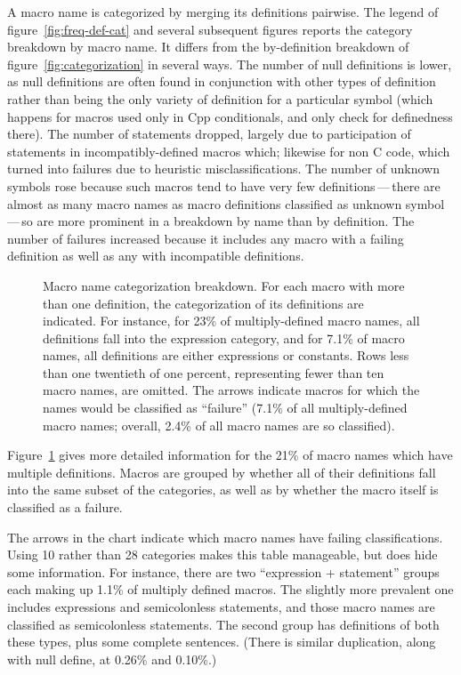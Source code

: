 \documentclass[10pt]{article}
\begin{document}
A macro name is categorized by merging its definitions pairwise.  The
legend of figure~\ref{fig:freq-def-cat} and several subsequent figures
reports the category breakdown by macro name.  It differs from the
by-definition breakdown of figure~\ref{fig:categorization} in several ways.
The number of null definitions is lower, as null definitions are often
found in conjunction with other types of definition rather than being the
only variety of definition for a particular symbol (which happens for
macros used only in Cpp conditionals, and only check for definedness
there).  The number of statements dropped, largely due to participation of
statements in incompatibly-defined macros which; likewise for non C code,
which turned into failures due to heuristic misclassifications.  The number
of unknown symbols rose because such macros tend to have very few
definitions\,---\,there are almost as many macro names as macro definitions
classified as unknown symbol\,---\,so are more prominent in a breakdown by
name than by definition.  The number of failures increased because it
includes any macro with a failing definition as well as any with
incompatible definitions.


\begin{figure}
  {\small\centerline{}}
  
  \caption{Macro name categorization breakdown.  For each macro with more
    than one definition, the categorization of its definitions are
    indicated.  For instance, for 23\% of multiply-defined macro names, all
    definitions fall into the expression category, and for 7.1\% of macro
    names, all definitions are either expressions or constants.  Rows less
    than one twentieth of one percent, representing fewer than ten macro
    names, are omitted.  The arrows indicate macros for which the names
    would be classified as ``failure'' (7.1\% of all multiply-defined macro
    names; overall, 2.4\% of all macro names are so classified).}

  \label{fig:subset-categories}
\end{figure}

Figure~\ref{fig:subset-categories} gives more detailed information for the
21\% of macro names which have multiple definitions.  Macros are grouped by
whether all of their definitions fall into the same subset of the
categories, as well as by whether the macro itself is classified as a
failure.

The arrows in the chart indicate which macro names have failing
classifications.  Using 10 rather than 28 categories makes this table
manageable, but does hide some information.  For instance, 
there are two ``expression + statement'' groups each making up
1.1\% of multiply defined macros.  The slightly more prevalent one includes
expressions and semicolonless statements, and those macro names are
classified as semicolonless statements.  The second group has definitions
of both these types, plus some complete sentences.  (There is similar
duplication, along with null define, at 0.26\% and 0.10\%.)
\end{document}
